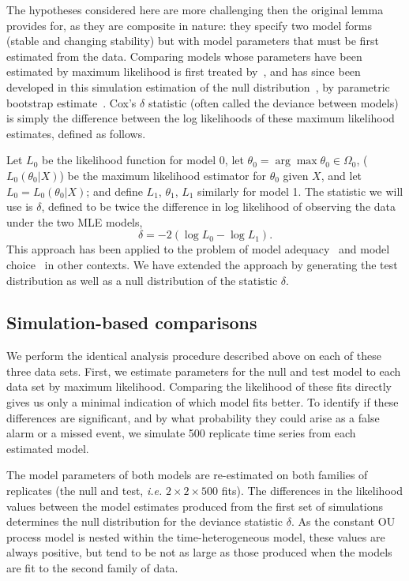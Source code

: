 \documentclass[authoryear,review,11pt]{elsarticle}
\begin{document}
The hypotheses considered here are more challenging then the original lemma provides for,
as they are composite in nature:
they specify two model forms (stable and changing stability)
but with model parameters that must be first estimated from the data.
Comparing models whose parameters have been estimated by maximum likelihood is first treated by~\citet{Cox1961, Cox1962},
and has since been developed in this simulation estimation of the null distribution~\citep{McLachlan1987}, by parametric bootstrap estimate~\citep{Efron1987}.
Cox's $\delta$ statistic (often called the deviance between models)
is simply the difference between the log likelihoods of these maximum likelihood estimates, defined as follows.

Let $L_0$ be the likelihood function for model 0,
let $\theta_0 = \arg \max \theta_0 \in \Omega_0$, ($L_0 (\theta_0 |X)$)
be the maximum likelihood estimator for $\theta_0$ given $X$, and let $L_0 = L_0 (\theta_0 |X)$;
and define $L_1$, $\theta_1$, $L_1$ similarly for model 1.
The statistic we will use is $\delta$,
defined to be twice the difference in log likelihood of observing the data under the two MLE models,
\begin{equation}\label{delta}
\delta = -2 (\log L_0 - \log L_1 ).
\end{equation}
This approach has been applied to the problem of model adequacy~\citep{Goldman1993}
and model choice~\citep{Huelsenbeck1996} in other contexts.
We have extended the approach by generating the test distribution
as well as a null distribution of the statistic $\delta$.


\subsection{Simulation-based comparisons} \label{simbased}
We perform the identical analysis procedure described above on each of these three data sets.
First, we estimate parameters for the null and test model to each data set by maximum likelihood.
Comparing the likelihood of these fits directly gives us only a minimal indication of which model fits better. 
To identify if these differences are significant,
and by what probability they could arise as a false alarm or a missed event,
we simulate 500 replicate time series from each estimated model.

The model parameters of both models are re-estimated on both families of replicates
(the null and test, \emph{i.e.} $2 \times 2 \times 500$ fits).
The differences in the likelihood values between the model estimates produced from the first set of simulations
determines the null distribution for the deviance statistic $\delta$.
As the constant OU process model is nested within the time-heterogeneous model, these values are always positive,
but tend to be not as large as those produced when the models are fit to the second family of data.
\end{document}
